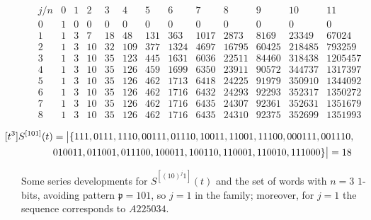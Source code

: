 \begin{table}
\begin{equation*}\begin{array}{c|cccccccccccc}j/n & 0 & 1 & 2 & 3 & 4 & 5 & 6 & 7 & 8 & 9 & 10 & 11\\\hline0 & 1 & 0 & 0 & 0 & 0 & 0 & 0 & 0 & 0 & 0 & 0 & 0\\1 & 1 & 3 & 7 & 18 & 48 & 131 & 363 & 1017 & 2873 & 8169 & 23349 & 67024\\2 & 1 & 3 & 10 & 32 & 109 & 377 & 1324 & 4697 & 16795 & 60425 & 218485 & 793259\\3 & 1 & 3 & 10 & 35 & 123 & 445 & 1631 & 6036 & 22511 & 84460 & 318438 & 1205457\\4 & 1 & 3 & 10 & 35 & 126 & 459 & 1699 & 6350 & 23911 & 90572 & 344737 & 1317397\\5 & 1 & 3 & 10 & 35 & 126 & 462 & 1713 & 6418 & 24225 & 91979 & 350910 & 1344092\\6 & 1 & 3 & 10 & 35 & 126 & 462 & 1716 & 6432 & 24293 & 92293 & 352317 & 1350272\\7 & 1 & 3 & 10 & 35 & 126 & 462 & 1716 & 6435 & 24307 & 92361 & 352631 & 1351679\\8 & 1 & 3 & 10 & 35 & 126 & 462 & 1716 & 6435 & 24310 & 92375 & 352699 & 1351993\end{array}\end{equation*}

\begin{displaymath}
    \hspace{-1.5cm}
    \begin{split}
    [t^{3}]S^{[101]}(t) &= \big|\lbrace 111, 0111, 1110, 00111, 01110, 10011, 11001, 11100, 000111, 001110,\\
    & 010011, 011001, 011100, 100011, 100110, 110001, 110010, 111000 \rbrace\big| = 18
    \end{split}
\end{displaymath}

\caption{Some series developments for $S^{[(10)^{j}1]}(t)$ and the set of words
with $n=3$ $1$-bits, avoiding pattern $\mathfrak{p}=101$, so $j=1$ in the family;
moreover, for $j=1$ the sequence corresponds to $A225034$.}
\label{tbl:S10_j:1}
\end{table}

